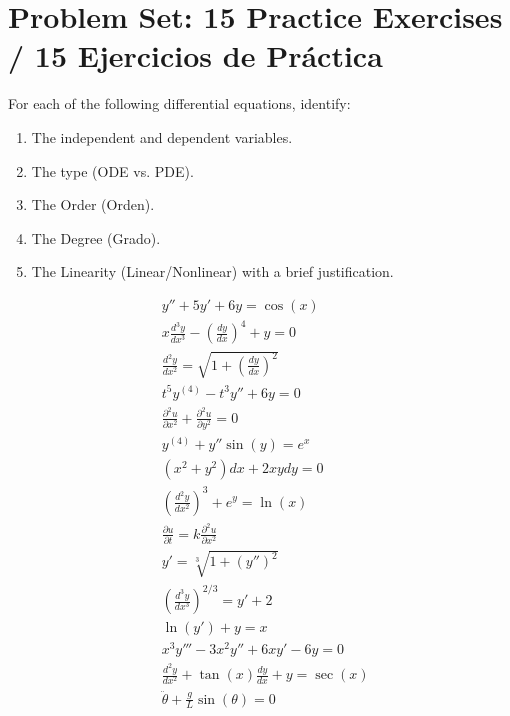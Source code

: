 \documentclass[11pt,letterpaper]{article}
\begin{document}
\section{Problem Set: 15 Practice Exercises / 15 Ejercicios de Práctica}

For each of the following differential equations, identify:
\begin{enumerate}[label=(\alph*)]
    \item The independent and dependent variables.
    \item The type (ODE vs. PDE).
    \item The Order (Orden).
    \item The Degree (Grado).
    \item The Linearity (Linear/Nonlinear) with a brief justification.
\end{enumerate}

\begin{align}
    & y'' + 5y' + 6y = \cos(x) \label{eq:ex1} \\
    & x \frac{d^3 y}{dx^3} - \left(\frac{dy}{dx}\right)^4 + y = 0 \label{eq:ex2} \\
    & \frac{d^2 y}{dx^2} = \sqrt{1 + \left(\frac{dy}{dx}\right)^2} \label{eq:ex3} \\
    & t^5 y^{(4)} - t^3 y'' + 6y = 0 \label{eq:ex4} \\
    & \frac{\partial^2 u}{\partial x^2} + \frac{\partial^2 u}{\partial y^2} = 0 \label{eq:ex5} \\
    & y^{(4)} + y'' \sin(y) = e^x \label{eq:ex6} \\
    & (x^2 + y^2)dx + 2xydy = 0 \label{eq:ex7} \\
    & \left(\frac{d^2 y}{dx^2}\right)^3 + e^y = \ln(x) \label{eq:ex8} \\
    & \frac{\partial u}{\partial t} = k \frac{\partial^2 u}{\partial x^2} \label{eq:ex9} \\
    & y' = \sqrt[3]{1 + (y'')^2} \label{eq:ex10} \\
    & \left(\frac{d^3 y}{dx^3}\right)^{2/3} = y' + 2 \label{eq:ex11} \\
    & \ln(y') + y = x \label{eq:ex12} \\
    & x^3 y''' - 3x^2 y'' + 6xy' - 6y = 0 \label{eq:ex13} \\
    & \frac{d^2 y}{dx^2} + \tan(x) \frac{dy}{dx} + y = \sec(x) \label{eq:ex14} \\
    & \ddot{\theta} + \frac{g}{L} \sin(\theta) = 0 \label{eq:ex15}
\end{align}
\end{document}
